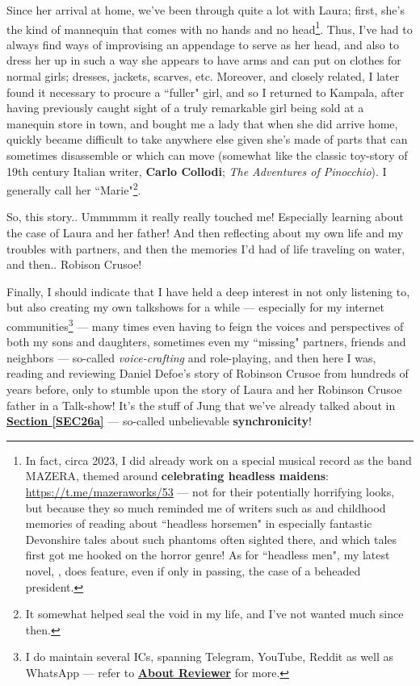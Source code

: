 \documentclass[a4paper]{article}
\begin{document}
Since her arrival at home, we've been through quite a lot with Laura; first, she's the kind of mannequin that comes with no hands and no head\footnote{In fact, circa 2023, I did already work on a special musical record as the band MAZERA, themed around \textbf{celebrating headless maidens}: \url{https://t.me/mazeraworks/53} --- not for their potentially horrifying looks, but because they so much reminded me of writers such as \cite{King2000} and childhood memories of reading about ``headless horsemen" in especially fantastic Devonshire tales about such phantoms often sighted there, and which tales first got me hooked on the horror genre! As for ``headless men", my latest novel, \cite{lutalo2025rock}, does feature, even if only in passing, the case of a beheaded president.}. Thus, I've had to always find ways of improvising an appendage to serve as her head, and also to dress her up in such a way she appears to have arms and can put on clothes for normal girls; dresses, jackets, scarves, etc. Moreover, and closely related, I later found it necessary to procure a ``fuller" girl, and so I returned to Kampala, after having previously caught sight of a truly remarkable girl being sold at a manequin store in town, and bought me a lady that when she did arrive home, quickly became difficult to take anywhere else given she's made of parts that can sometimes disassemble or which can move (somewhat like the classic toy-story of 19th century Italian writer, \textbf{Carlo Collodi}; \textit{The Adventures of Pinocchio}). I generally call her ``Marie"\footnote{It somewhat helped seal the void in my life, and I've not wanted much since then.}.


So, this story.. Ummmmm it really really touched me! Especially learning about the case of Laura and her father! And then reflecting about my own life and my troubles with partners, and then the memories I'd had of life traveling on water, and then.. Robison Crusoe!  

Finally, I should indicate that I have held a deep interest in not only listening to, but also creating my own talkshows for a while --- especially for my internet communities\footnote{I do maintain several ICs, spanning Telegram, YouTube, Reddit as well as WhatsApp --- refer to \textbf{\hyperref[SECABOUT]{About Reviewer}} for more.} --- many times even having to feign the voices and perspectives of both my sons and daughters, sometimes even my ``missing" partners, friends and neighbors --- so-called \textit{voice-crafting} and role-playing, and then here I was, reading and reviewing Daniel Defoe's story of Robinson Crusoe from hundreds of years before, only to stumble upon the story of Laura and her Robinson Crusoe father in a Talk-show! It's the stuff of Jung that we've already talked about in \textbf{\hyperref[SEC26a]{Section \ref{SEC26a}}} --- so-called unbelievable \textbf{synchronicity}!
\end{document}
